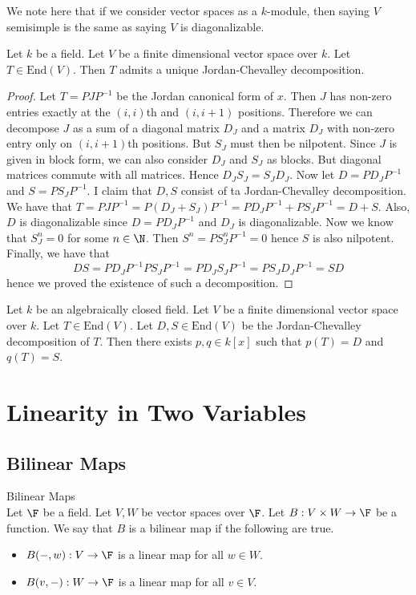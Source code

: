 \documentclass[a4paper]{article}
\begin{document}
We note here that if we consider vector spaces as a $k$-module, then saying $V$ semisimple is the same as saying $V$ is diagonalizable. 

\begin{prp}{}{} Let $k$ be a field. Let $V$ be a finite dimensional vector space over $k$. Let $T\in\text{End}(V)$. Then $T$ admits a unique Jordan-Chevalley decomposition. 
\begin{proof}
Let $T=PJP^{-1}$ be the Jordan canonical form of $x$. Then $J$ has non-zero entries exactly at the $(i,i)$th and $(i,i+1)$ positions. Therefore we can decompose $J$ as a sum of a diagonal matrix $D_J$ and a matrix $D_J$ with non-zero entry only on $(i,i+1)$th positions. But $S_J$ must then be nilpotent. Since $J$ is given in block form, we can also consider $D_J$ and $S_J$ as blocks. But diagonal matrices commute with all matrices. Hence $D_JS_J=S_JD_J$. Now let $D=PD_JP^{-1}$ and $S=PS_JP^{-1}$. I claim that $D,S$ consist of ta Jordan-Chevalley decomposition. We have that $T=PJP^{-1}=P(D_J+S_J)P^{-1}=PD_JP^{-1}+PS_JP^{-1}=D+S$. Also, $D$ is diagonalizable since $D=PD_JP^{-1}$ and $D_J$ is diagonalizable. Now we know that $S_J^n=0$ for some $n\in\N$. Then $S^n=PS_J^nP^{-1}=0$ hence $S$ is also nilpotent. Finally, we have that $$DS=PD_JP^{-1}PS_JP^{-1}=PD_JS_JP^{-1}=PS_JD_JP^{-1}=SD$$ hence we proved the existence of such a decomposition. 
\end{proof}
\end{prp}

\begin{prp}{}{} Let $k$ be an algebraically closed field. Let $V$ be a finite dimensional vector space over $k$. Let $T\in\text{End}(V)$. Let $D,S\in\text{End}(V)$ be the Jordan-Chevalley decomposition of $T$. Then there exists $p,q\in k[x]$ such that $p(T)=D$ and $q(T)=S$. 
\end{prp}

\pagebreak
\section{Linearity in Two Variables}
\subsection{Bilinear Maps}
\begin{defn}{Bilinear Maps}{}\\
Let $\F$ be a field. Let $V,W$ be vector spaces over $\F$. Let $B:V\times W\to\F$ be a function. We say that $B$ is a bilinear map if the following are true. 
\begin{itemize}
\item $B(-,w):V\to\F$ is a linear map for all $w\in W$. 
\item $B(v,-):W\to\F$ is a linear map for all $v\in V$. 
\end{itemize}
\end{defn}
\end{document}
